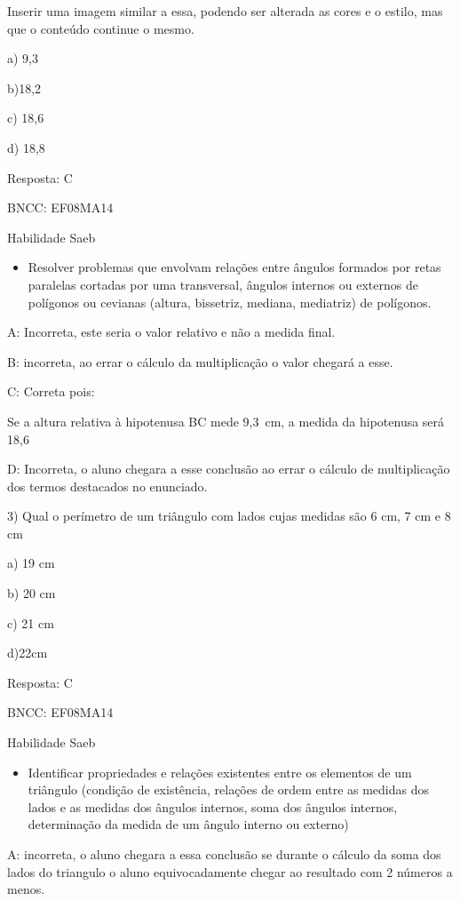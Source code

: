 Inserir uma imagem similar a essa, podendo ser alterada as cores e o
estilo, mas que o conteúdo continue o mesmo.

a) 9,3

b)18,2

c) 18,6

d) 18,8

Resposta: C

BNCC: EF08MA14

Habilidade Saeb

\begin{itemize}
\tightlist
\item
  Resolver problemas que envolvam relações entre ângulos formados por
  retas paralelas cortadas por uma transversal, ângulos internos ou
  externos de polígonos ou cevianas (altura, bissetriz, mediana,
  mediatriz) de polígonos.
\end{itemize}

A: Incorreta, este seria o valor relativo e não a medida final.

B: incorreta, ao errar o cálculo da multiplicação o valor chegará a
esse.

C: Correta pois:

Se a altura relativa à hipotenusa BC mede 9,3~cm, a medida da hipotenusa
será 18,6

D: Incorreta, o aluno chegara a esse conclusão ao errar o cálculo de
multiplicação dos termos destacados no enunciado.

3) Qual o perímetro de um triângulo com lados cujas medidas são 6 cm, 7
cm e 8 cm

a) 19 cm

b) 20 cm

c) 21 cm

d)22cm

Resposta: C

BNCC: EF08MA14

Habilidade Saeb

\begin{itemize}
\tightlist
\item
  Identificar propriedades e relações existentes entre os elementos de
  um triângulo (condição de existência, relações de ordem entre as
  medidas dos lados e as medidas dos ângulos internos, soma dos ângulos
  internos, determinação da medida de um ângulo interno ou externo)
\end{itemize}

A: incorreta, o aluno chegara a essa conclusão se durante o cálculo da
soma dos lados do triangulo o aluno equivocadamente chegar ao resultado
com 2 números a menos.

